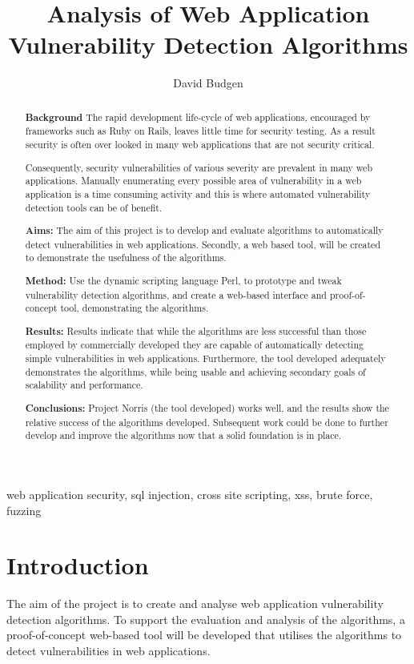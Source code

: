 \documentclass[12pt,a4paper]{article}
\title{Analysis of Web Application Vulnerability Detection Algorithms}
\author{David Budgen}
\date{}
\begin{document}
\maketitle

\begin{abstract}
    
    {\bf Background}
    The rapid development life-cycle of web applications, encouraged by frameworks such as Ruby on Rails, leaves little time for security testing.  As a result security is often over looked in many web applications that are not security critical.

    Consequently, security vulnerabilities of various severity are prevalent in many web applications.  Manually enumerating every possible area of vulnerability in a web application is a time consuming activity and this is where automated vulnerability detection tools can be of benefit.
    
    {\bf Aims:}
    The aim of this project is to develop and evaluate algorithms to automatically detect vulnerabilities in web applications.  Secondly, a web based tool, will be created to demonstrate the usefulness of the algorithms. 
    
    {\bf Method:}
    Use the dynamic scripting language Perl, to prototype and tweak vulnerability detection algorithms, and create a web-based interface and proof-of-concept tool, demonstrating the algorithms.
    
    {\bf Results:}
    Results indicate that while the algorithms are less successful than those employed by commercially developed they are capable of automatically detecting simple vulnerabilities in web applications.  Furthermore, the tool developed adequately demonstrates the algorithms, while being usable and achieving secondary goals of scalability and performance.
    
    {\bf Conclusions:}
    Project Norris (the tool developed) works well, and the results show the relative success of the algorithms developed.  Subsequent work could be done to further develop and improve the algorithms now that a solid foundation is in place.
\end{abstract}

\begin{keywords}
    web application security, sql injection, cross site scripting, xss, brute force, fuzzing
\end{keywords}

\section{Introduction}
The aim of the project is to create and analyse web application vulnerability detection algorithms.  To support the evaluation and analysis of the algorithms, a proof-of-concept web-based tool will be developed that utilises the algorithms to detect vulnerabilities in web applications.
\end{document}
